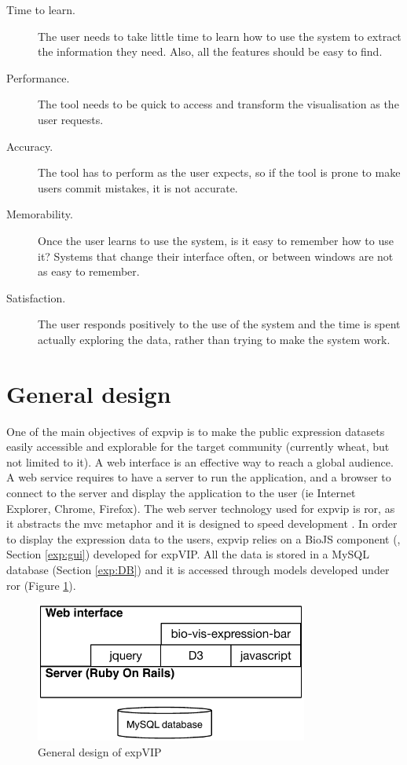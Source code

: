\begin{description}
\item[Time to learn.] The user needs to take little time to learn how to use the system to extract the information they need. Also, all the features should be easy to find.
\item[Performance.] The tool needs to be quick to access and transform the visualisation as the user requests.
\item[Accuracy.] The tool has to perform as the user expects, so if the tool is prone to make users commit mistakes, it is not accurate. 
\item[Memorability.] Once the user learns to use the system, is it easy to remember how to use it? Systems that change their interface often, or between windows are not as easy to remember. 
\item[Satisfaction.] The user responds positively to the use of the system and the time is spent actually exploring the data, rather than trying to make the system work. 
\end{description}


\section{General design}

One of the main objectives of \gls{expvip} is to make the public expression datasets easily accessible and explorable for the target community (currently wheat, but not limited to it). 
A web interface is an effective way to reach a global audience. 
A web service requires to have a server to run the application, and a browser to connect to the server and display the application to the user (ie Internet Explorer, Chrome, Firefox).
The web server technology used for \gls{expvip} is \acrshort{ror}, as it abstracts the \acrshort{mvc} metaphor and it is designed to speed development \citep{RailsGuide2016}. 
In order to display the expression data to the users,  \gls{expvip} relies on a BioJS component (\citealt{Yachdav2015}, Section \ref{exp:gui}) developed for expVIP. 
All the data is stored in a MySQL database (Section \ref{exp:DB}) and it is accessed through models developed under  \acrshort{ror} (Figure \ref{fig:poly:archDesign}).  

\begin{figure}[b] 
  \centering
  \includegraphics[width=0.8\textwidth]{expVIP/Figures/archDesign.pdf}
  \caption{General design of expVIP}
  \label{fig:poly:archDesign}
\end{figure}


